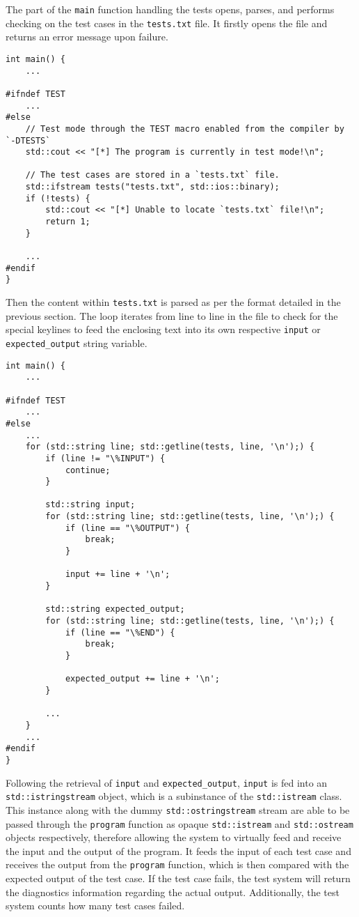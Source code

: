 \documentclass[12pt]{article}
\begin{document}
The part of the \texttt{main} function handling the tests opens, parses, and performs checking on the test cases in the \texttt{tests.txt} file. It firstly opens the file and returns an error message upon failure.

\begin{verbatim}
int main() {
    ...

#ifndef TEST
    ...
#else
    // Test mode through the TEST macro enabled from the compiler by `-DTESTS`
    std::cout << "[*] The program is currently in test mode!\n";

    // The test cases are stored in a `tests.txt` file.
    std::ifstream tests("tests.txt", std::ios::binary);
    if (!tests) {
        std::cout << "[*] Unable to locate `tests.txt` file!\n";
        return 1;
    }
    
    ...
#endif
}
\end{verbatim}
\pagebreak

Then the content within \texttt{tests.txt} is parsed as per the format detailed in the previous section. The loop iterates from line to line in the file to check for the special keylines to feed the enclosing text into its own respective \texttt{input} or \texttt{expected\_output} string variable.

\begin{verbatim}
int main() {
    ...

#ifndef TEST
    ...
#else
    ...
    for (std::string line; std::getline(tests, line, '\n');) {
        if (line != "\%INPUT") {
            continue;
        }

        std::string input;
        for (std::string line; std::getline(tests, line, '\n');) {
            if (line == "\%OUTPUT") {
                break;
            }

            input += line + '\n';
        }

        std::string expected_output;
        for (std::string line; std::getline(tests, line, '\n');) {
            if (line == "\%END") {
                break;
            }

            expected_output += line + '\n';
        }

		...
    }
	...
#endif
}
\end{verbatim}
\pagebreak

Following the retrieval of \texttt{input} and \texttt{expected\_output}, \texttt{input} is fed into an \texttt{std::istringstream} object, which is a subinstance of the \texttt{std::istream} class. This instance along with the dummy \texttt{std::ostringstream} stream are able to be passed through the \texttt{program} function as opaque \texttt{std::istream} and \texttt{std::ostream} objects respectively, therefore allowing the system to virtually feed and receive the input and the output of the program. It feeds the input of each test case and receives the output from the \texttt{program} function, which is then compared with the expected output of the test case. If the test case fails, the test system will return the diagnostics information regarding the actual output. Additionally, the test system counts how many test cases failed.
\end{document}
